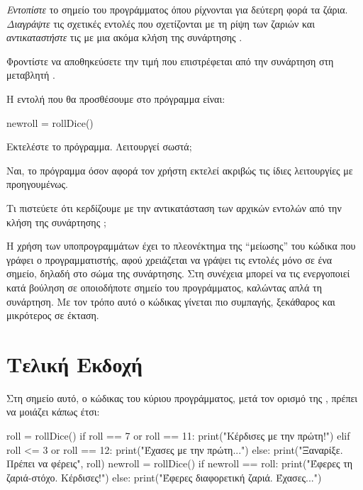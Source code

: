 \documentclass[a4paper,11pt,oneside]{book}
\begin{document}
\begin{step}
\emph{Εντοπίστε} το σημείο του προγράμματος όπου ρίχνονται για δεύτερη φορά τα ζάρια. \emph{Διαγράψτε} τις σχετικές εντολές
που σχετίζονται με τη ρίψη των ζαριών και \emph{αντικαταστήστε} τις με μια ακόμα κλήση της συνάρτησης . 

\marginnote[18pt]{\iconcaution}
Φροντίστε να αποθηκεύσετε την τιμή που επιστρέφεται από την συνάρτηση στη μεταβλητή .

\clearpage
\begin{answer}
Η εντολή που θα προσθέσουμε στο πρόγραμμα είναι:

\begin{pynew}
newroll = rollDice()
\end{pynew}
\end{answer}

Εκτελέστε το πρόγραμμα. Λειτουργεί σωστά;

\begin{answer}
Ναι, το πρόγραμμα όσον αφορά τον χρήστη εκτελεί ακριβώς τις ίδιες λειτουργίες με προηγουμένως.
\end{answer}

Τι πιστεύετε ότι κερδίζουμε με την αντικατάσταση των αρχικών εντολών από την κλήση της συνάρτησης ;

\begin{answer}
Η χρήση των υποπρογραμμάτων έχει το πλεονέκτημα της ``μείωσης'' του κώδικα που γράφει ο προγραμματιστής, αφού χρειάζεται να γράψει τις εντολές μόνο σε ένα σημείο, δηλαδή στο σώμα της συνάρτησης. Στη συνέχεια μπορεί να τις ενεργοποιεί κατά βούληση σε οποιοδήποτε σημείο του προγράμματος, καλώντας απλά τη συνάρτηση. Με τον τρόπο αυτό ο κώδικας γίνεται πιο συμπαγής, ξεκάθαρος και μικρότερος σε έκταση.
\end{answer}
\end{step}

\section{Τελική Εκδοχή}

Στη σημείο αυτό, ο κώδικας του κύριου προγράμματος, μετά τον ορισμό της , πρέπει να μοιάζει κάπως έτσι:

\begin{pyplain}
roll = rollDice()
if roll == 7 or roll == 11:
    print("Κέρδισες με την πρώτη!")
elif roll <= 3 or roll == 12:
    print("Έχασες με την πρώτη...") 
else:
    print("Ξαναρίξε. Πρέπει να φέρεις", roll)
    newroll = rollDice()
    if newroll == roll:
        print("Έφερες τη ζαριά-στόχο. Κέρδισες!")
    else:
        print("Έφερες διαφορετική ζαριά. Έχασες...")
\end{pyplain}
\end{document}
